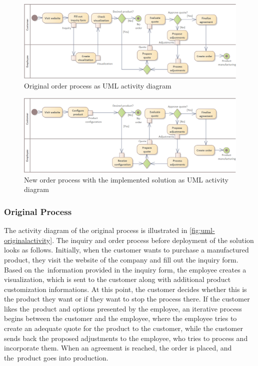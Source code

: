 \begin{landscape}
\begin{figure}[h!]
\centering
\includegraphics[width=0.67\linewidth]{images/uml_originalactivity.png}
\caption{Original order process as UML activity diagram}
\label{fig:uml-originalactivity}
\end{figure}
\begin{figure}[h!]
\centering
\includegraphics[width=0.67\linewidth]{images/uml_newactivity.png}
\caption{New order process with the implemented solution as UML activity diagram}
\label{fig:uml-newactivity}
\end{figure}
\end{landscape}


\subsubsection{Original Process}


The  activity diagram of the original process is illustrated in \autoref{fig:uml-originalactivity}. The inquiry and order process before deployment of the solution looks as follows. Initially, when the customer wants to purchase a manufactured product, they visit the website of the company and fill out the inquiry form. Based on the~information provided in the inquiry form, the employee creates a visualization, which is sent to the customer along with additional product customization informations. At this point, the customer decides whether this is the product they want or if they want to stop the process there. If the customer likes the~product and options presented by the employee, an iterative process begins between the customer and the employee, where the employee tries to create an adequate quote for the product to the customer, while the customer sends back the proposed adjustments to the employee, who tries to process and incorporate them. When an agreement is reached, the order is placed, and the~product goes into production. 


